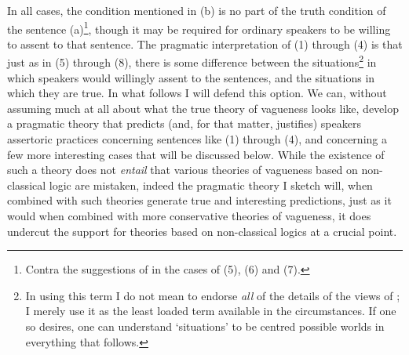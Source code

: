 
\noindent In all cases, the condition mentioned in (b) is no part of the truth condition of the sentence (a)\footnote{Contra the suggestions of \citet{Wittgenstein1953, Hart1961, Ryle1949} in the cases of (5), (6) and (7).}, though it may be required for ordinary speakers to be willing to assent to that sentence. The pragmatic interpretation of (1) through (4) is that just as in (5) through (8), there is some difference between the situations\footnote{In using this term I do not mean to endorse \textit{all} of the details of the views of \citet{BarwisePerry1983}; I merely use it as the least loaded term available in the circumstances. If one so desires, one can understand `situations' to be centred possible worlds in everything that follows.} in which speakers would willingly assent to the sentences, and the situations in which they are true. In what follows I will defend this option. We can, without assuming much at all about what the true theory of vagueness looks like, develop a pragmatic theory that predicts (and, for that matter, justifies) speakers assertoric practices concerning sentences like (1) through (4), and concerning a few more interesting cases that will be discussed below. While the existence of such a theory does not \textit{entail} that various theories of vagueness based on non-classical logic are mistaken, indeed the pragmatic theory I sketch will, when combined with such theories generate true and interesting predictions, just as it would when combined with more conservative theories of vagueness, it does undercut the support for theories based on non-classical logics at a crucial point.

